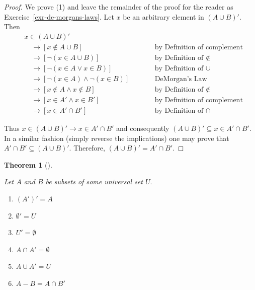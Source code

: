 \documentclass[
  letterpaper,
  10pt,
  reqno,
  twopage,
  openany]{book}
\providecommand{\tightlist}{%
  \setlength{\itemsep}{0pt}\setlength{\parskip}{0pt}}\usepackage{longtable,booktabs,array}
\theoremstyle{plain}
\theoremstyle{definition}
\theoremstyle{definition}
\theoremstyle{definition}
\theoremstyle{plain}
\theoremstyle{plain}
\newtheorem{theorem}{Theorem}[chapter]
\theoremstyle{remark}
\begin{document}
\begin{proof}

We prove (1) and leave the remainder of the proof for the reader as
Exercise~\ref{exr-de-morgans-laws}. Let \(x\) be an arbitrary element in
\((A \cup B)'.\) Then \begin{align*}
& x\in (A \cup B)' & \qquad & \\
& \quad \rightarrow [x\notin A \cup B] & &  \text{by Definition of complement} \\
& \quad \rightarrow [\neg(x\in A \cup B)] & &  \text{by Definition of $\notin$} \\
& \quad \rightarrow [\neg(x\in A \lor x\in B)] & &  \text{by Definition of $\cup$} \\
& \quad \rightarrow [\neg(x\in A) \land \neg(x\in B)] & &  \text{DeMorgan's Law} \\
& \quad \rightarrow [x\notin A \land x\notin B] & &  \text{by Definition of $\notin$} \\
& \quad \rightarrow [x\in A' \land x\in B'] & &  \text{by Definition of complement} \\
& \quad \rightarrow [x\in A' \cap B'] & &  \text{by Definition of $\cap$}
\end{align*}

Thus \(x\in (A \cup B)' \rightarrow x\in A' \cap B'\) and consequently
\((A \cup B)' \subseteq x\in A' \cap B'.\) In a similar fashion (simply
reverse the implications) one may prove that
\(A' \cap B' \subseteq (A \cup B)'.\) Therefore,
\((A \cup B)'=A' \cap B'\).

\end{proof}

\leavevmode{}%
\begin{theorem}[]\label{thm-emptyset-cup-cap}

Let \(A\) and \(B\) be subsets of some universal set \(U.\)

\begin{enumerate}
\def\labelenumi{\arabic{enumi}.}
\tightlist
\item
  \((A')'=A\)
\item
  \(\emptyset '=U\)
\item
  \(U'=\emptyset\)
\item
  \(A \cap A'=\emptyset\)
\item
  \(A \cup A' =U\)
\item
  \(A-B=A\cap B'\)
\end{enumerate}

\end{theorem}
\end{document}
